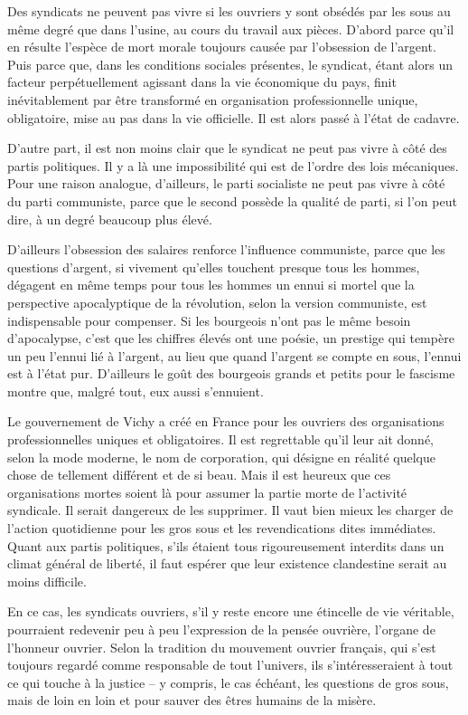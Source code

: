 \documentclass[french,twoside]{book} %
\begin{document}
Des syndicats ne peuvent pas vivre si les ouvriers y sont obsédés par les sous au même degré que dans l'usine, au cours du travail aux pièces. D'abord parce qu'il en résulte l'espèce de mort morale toujours causée par l'obsession de l'argent. Puis parce que, dans les conditions sociales présentes, le syndicat, étant alors un facteur perpétuellement agissant dans la vie économique du pays, finit inévitablement par être transformé en organisation professionnelle unique, obligatoire, mise au pas dans la vie officielle. Il est alors passé à l'état de cadavre.\par
D'autre part, il est non moins clair que le syndicat ne peut pas vivre à côté des partis politiques. Il y a là une impossibilité qui est de l'ordre des lois mécaniques. Pour une raison analogue, d'ailleurs, le parti socialiste ne peut pas vivre à côté du parti communiste, parce que le second possède la qualité de parti, si l'on peut dire, à un degré beaucoup plus élevé.\par
D'ailleurs l'obsession des salaires renforce l'influence communiste, parce que les questions d’argent, si vivement qu'elles touchent presque tous les hommes, dégagent en même temps pour tous les hommes un ennui si mortel que la perspective apocalyptique de la révolution, selon la version communiste, est indispensable pour compenser. Si les bourgeois n'ont pas le même besoin d'apocalypse, c'est que les chiffres élevés ont une poésie, un prestige qui tempère un peu l'ennui lié à l'argent, au lieu que quand l'argent se compte en sous, l'ennui est à l'état pur. D'ailleurs le goût des bourgeois grands et petits pour le fascisme montre que, malgré tout, eux aussi s'ennuient.\par
Le gouvernement de Vichy a créé en France pour les ouvriers des organisations professionnelles uniques et obligatoires. Il est regrettable qu'il leur ait donné, selon la mode moderne, le nom de corporation, qui désigne en réalité quelque chose de tellement différent et de si beau. Mais il est heureux que ces organisations mortes soient là pour assumer la partie morte de l'activité syndicale. Il serait dangereux de les supprimer. Il vaut bien mieux les charger de l'action quotidienne pour les gros sous et les revendications dites immédiates. Quant aux partis politiques, s'ils étaient tous rigoureusement interdits dans un climat général de liberté, il faut espérer que leur existence clandestine serait au moins difficile.\par
En ce cas, les syndicats ouvriers, s'il y reste encore une étincelle de vie véritable, pourraient redevenir peu à peu l'expression de la pensée ouvrière, l'organe de l'honneur ouvrier. Selon la tradition du mouvement ouvrier français, qui s'est toujours regardé comme responsable de tout l'univers, ils s'intéresseraient à tout ce qui touche à la justice – y compris, le cas échéant, les questions de gros sous, mais de loin en loin et pour sauver des êtres humains de la misère.\par
\end{document}

